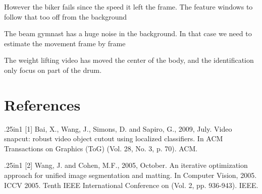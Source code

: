 \documentclass[15pt]{article}
\begin{document}
However the biker fails since the speed it left the frame. The feature windows to follow that too off from the background

The beam gymnast has a huge noise in the background. In that case we need to estimate the movement frame by frame 

The weight lifting video has moved the center of the body, and the identification only focus on part of the drum.



\section*{References}
\small
\begin{hangparas}{.25in}{1}
[1] Bai, X., Wang, J., Simons, D. and Sapiro, G., 2009, July. Video snapcut: robust video object cutout using localized classifiers. In ACM Transactions on Graphics (ToG) (Vol. 28, No. 3, p. 70). ACM.
\end{hangparas}

\begin{hangparas}{.25in}{1}
[2] Wang, J. and Cohen, M.F., 2005, October. An iterative optimization approach for unified image segmentation and matting. In Computer Vision, 2005. ICCV 2005. Tenth IEEE International Conference on (Vol. 2, pp. 936-943). IEEE.
\end{hangparas}
\end{document}

